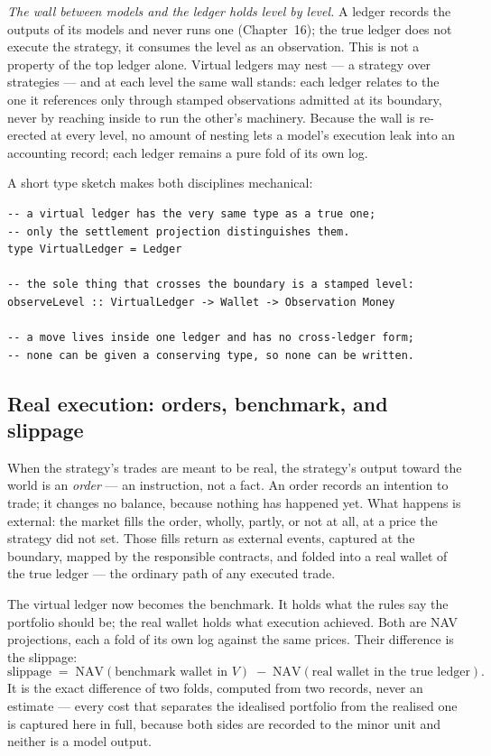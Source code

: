 \emph{The wall between models and the ledger holds level by level.} A ledger
records the outputs of its models and never runs one (Chapter~16); the true
ledger does not execute the strategy, it consumes the level as an observation.
This is not a property of the top ledger alone. Virtual ledgers may nest --- a
strategy over strategies --- and at each level the same wall stands: each ledger
relates to the one it references only through stamped observations admitted at
its boundary, never by reaching inside to run the other's machinery. Because the
wall is re-erected at every level, no amount of nesting lets a model's execution
leak into an accounting record; each ledger remains a pure fold of its own log.

A short type sketch makes both disciplines mechanical:

\begin{lstlisting}
-- a virtual ledger has the very same type as a true one;
-- only the settlement projection distinguishes them.
type VirtualLedger = Ledger

-- the sole thing that crosses the boundary is a stamped level:
observeLevel :: VirtualLedger -> Wallet -> Observation Money

-- a move lives inside one ledger and has no cross-ledger form;
-- none can be given a conserving type, so none can be written.
\end{lstlisting}

\subsection{Real execution: orders, benchmark, and slippage}

When the strategy's trades are meant to be real, the strategy's output toward the
world is an \emph{order} --- an instruction, not a fact. An order records an
intention to trade; it changes no balance, because nothing has happened yet. What
happens is external: the market fills the order, wholly, partly, or not at all,
at a price the strategy did not set. Those fills return as external events,
captured at the boundary, mapped by the responsible contracts, and folded into a
real wallet of the true ledger --- the ordinary path of any executed trade.

The virtual ledger now becomes the benchmark. It holds what the rules say the
portfolio should be; the real wallet holds what execution achieved. Both are NAV
projections, each a fold of its own log against the same prices. Their difference
is the slippage:
\[
  \text{slippage} \;=\; \mathrm{NAV}(\text{benchmark wallet in } V) \;-\;
                        \mathrm{NAV}(\text{real wallet in the true ledger}).
\]
It is the exact difference of two folds, computed from two records, never an
estimate --- every cost that separates the idealised portfolio from the realised
one is captured here in full, because both sides are recorded to the minor unit
and neither is a model output.

